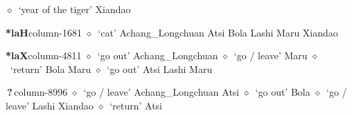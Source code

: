 \hspace{1ex}
         $\diamond$~`year of the tiger'
         Xiandao 
  \item {\footnotesize \textbf{*laH}}{\tiny column-1681}
         $\diamond$~`cat'
         Achang\_Longchuan 
\hspace{1ex}
         Atsi 
\hspace{1ex}
         Bola 
\hspace{1ex}
         Lashi 
\hspace{1ex}
         Maru 
\hspace{1ex}
         Xiandao 
  \item {\footnotesize \textbf{*laX}}{\tiny column-4811}
         $\diamond$~`go out'
         Achang\_Longchuan 
\hspace{1ex}
         $\diamond$~`go / leave'
         Maru 
\hspace{1ex}
         $\diamond$~`return'
         Bola 
\hspace{1ex}
         Maru 
\hspace{1ex}
         $\diamond$~`go out'
         Atsi 
\hspace{1ex}
         Lashi 
\hspace{1ex}
         Maru 
  \item {\footnotesize \textbf{\,?\,}}{\tiny column-8996}
         $\diamond$~`go / leave'
         Achang\_Longchuan 
\hspace{1ex}
         Atsi 
\hspace{1ex}
         $\diamond$~`go out'
         Bola 
\hspace{1ex}
         $\diamond$~`go / leave'
         Lashi 
\hspace{1ex}
         Xiandao 
\hspace{1ex}
         $\diamond$~`return'
         Atsi 
\hspace{1ex}
